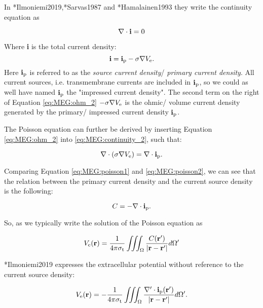 {In \citeasnoun**{Ilmoniemi2019},\citeasnoun**{Sarvas1987} and \citeasnoun**{Hamalainen1993} they write the continuity equation as

\begin{equation} \label{eq:MEG:continuity_2}
{\bf \nabla} \cdot {\bf i} = 0
\end{equation}

Where {\bf i} is the total current density:
\begin{equation}\label{eq:MEG:ohm_2}
{\bf i} = {\bf i}_\mathrm{p} - \sigma {\bf \nabla} V_\mathrm{e}.
\end{equation}
Here ${\bf i}_\mathrm{p}$ is referred to as the \textit{source current density}/ \textit{primary current density}.  All current sources, i.e. transmembrane currents are included in ${\bf i}_\mathrm{p}$, so we could as well have named ${\bf i}_\mathrm{p}$ the "impressed current density".
The second term on the right of Equation \eqref{eq:MEG:ohm_2} $- \sigma {\bf \nabla} V_\mathrm{e}$ is the ohmic/ volume current density generated by the primary/ impressed current density ${\bf i}_\mathrm{p}$.

The Poisson equation can further be derived by inserting Equation \eqref{eq:MEG:ohm_2} into \eqref{eq:MEG:continuity_2}, such that:

\begin{equation}\label{eq:MEG:poisson2}
{\bf \nabla} \cdot (\sigma {\bf \nabla} V_\mathrm{e}) = {\bf \nabla} \cdot {\bf i}_\mathrm{p}.
\end{equation}


Comparing Equation \eqref{eq:MEG:poisson1} and \eqref{eq:MEG:poisson2}, we can see that the relation between the primary current density and the current source density is the following:

\begin{equation}
C = - {\bf \nabla} \cdot {\bf i}_\mathrm{p}.
\end{equation}

So, as we typically write the solution of the Poisson equation as

\begin{equation}
V_\mathrm{e}({\bf r}) = \frac{1}{4\pi \sigma_\mathrm{t}} \iiint_\Omega \frac{C({\bf r}')}{|{\bf r} - {\bf r}'|} d\Omega' 
\end{equation}

\citeasnoun**{Ilmoniemi2019} expresses the extracellular potential without reference to the current source density:

\begin{equation}
V_\mathrm{e}({\bf r}) = - \frac{1}{4\pi \sigma_\mathrm{t}} \iiint_\Omega \frac{{\bf \nabla}' \cdot {\bf i}_\mathrm{p}({\bf r}')}{|{\bf r} - {\bf r}'|} d\Omega'.
\end{equation}
}





